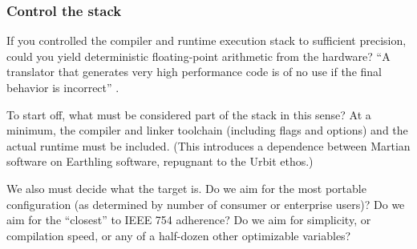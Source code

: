 \documentclass[twoside]{article}
\begin{document}
\subsubsection{Control the stack}

If you controlled the compiler and runtime execution stack to sufficient precision, could you yield deterministic floating-point arithmetic from the hardware?  “A translator that generates very high performance code is of no use if the final behavior is incorrect” \citep[p.~189]{Jones2008}.

To start off, what must be considered part of the stack in this sense?  At a minimum, the compiler and linker toolchain (including flags and options) and the actual runtime must be included.  (This introduces a dependence between Martian software on Earthling software, repugnant to the Urbit ethos.)

We also must decide what the target is.  Do we aim for the most portable configuration (as determined by number of consumer or enterprise users)?  Do we aim for the “closest” to IEEE 754 adherence?  Do we aim for simplicity, or compilation speed, or any of a half-dozen other optimizable variables?
\end{document}
